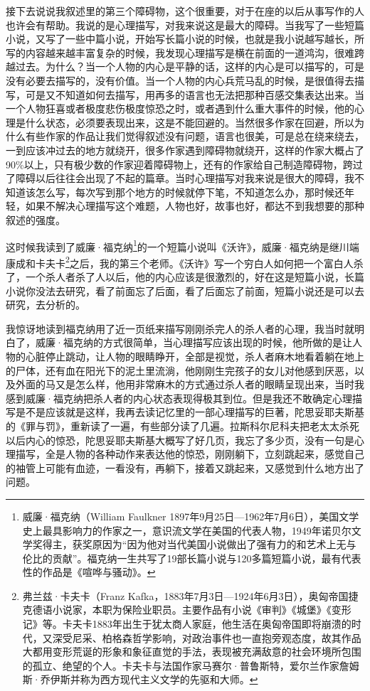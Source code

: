 \documentclass[fontset=fandol,12pt,a5paper]{ctexbook}
\begin{document}
接下去说说我叙述里的第三个障碍物，这个很重要，对于在座的以后从事写作的人也许会有帮助。我说的是心理描写，对我来说这是最大的障碍。当我写了一些短篇小说，又写了一些中篇小说，开始写长篇小说的时候，也就是我小说越写越长，所写的内容越来越丰富复杂的时候，我发现心理描写是横在前面的一道鸿沟，很难跨越过去。为什么？当一个人物的内心是平静的话，这样的内心是可以描写的，可是没有必要去描写的，没有价值。当一个人物的内心兵荒马乱的时候，是很值得去描写，可是又不知道如何去描写，用再多的语言也无法把那种百感交集表达出来。当一个人物狂喜或者极度悲伤极度惊恐之时，或者遇到什么重大事件的时候，他的心理是什么状态，必须要表现出来，这是不能回避的。当然很多作家在回避，所以为什么有些作家的作品让我们觉得叙述没有问题，语言也很美，可是总在绕来绕去，一到应该冲过去的地方就绕开，很多作家遇到障碍物就绕开，这样的作家大概占了90\%以上，只有极少数的作家迎着障碍物上，还有的作家给自己制造障碍物，跨过了障碍以后往往会出现了不起的篇章。当时心理描写对我来说是很大的障碍，我不知道该怎么写，每次写到那个地方的时候就停下笔，不知道怎么办，那时候还年轻，如果不解决心理描写这个难题，人物也好，故事也好，都达不到我想要的那种叙述的强度。

这时候我读到了威廉·福克纳\footnote{威廉·福克纳（William Faulkner 1897年9月25日—1962年7月6日），美国文学史上最具影响力的作家之一，意识流文学在美国的代表人物，1949年诺贝尔文学奖得主，获奖原因为“因为他对当代美国小说做出了强有力的和艺术上无与伦比的贡献”。福克纳一生共写了19部长篇小说与120多篇短篇小说，最有代表性的作品是《喧哗与骚动》。}的一个短篇小说叫《沃许》，威廉·福克纳是继川端康成和卡夫卡\footnote{弗兰兹·卡夫卡（Franz Kafka，1883年7月3日—1924年6月3日），奥匈帝国捷克德语小说家，本职为保险业职员。主要作品有小说《审判》《城堡》《变形记》等。卡夫卡1883年出生于犹太商人家庭，他生活在奥匈帝国即将崩溃的时代，又深受尼采、柏格森哲学影响，对政治事件也一直抱旁观态度，故其作品大都用变形荒诞的形象和象征直觉的手法，表现被充满敌意的社会环境所包围的孤立、绝望的个人。卡夫卡与法国作家马赛尔·普鲁斯特，爱尔兰作家詹姆斯·乔伊斯并称为西方现代主义文学的先驱和大师。}之后，我的第三个老师。《沃许》写一个穷白人如何把一个富白人杀了，一个杀人者杀了人以后，他的内心应该是很激烈的，好在这是短篇小说，长篇小说你没法去研究，看了前面忘了后面，看了后面忘了前面，短篇小说还是可以去研究，去分析的。

我惊讶地读到福克纳用了近一页纸来描写刚刚杀完人的杀人者的心理，我当时就明白了，威廉·福克纳的方式很简单，当心理描写应该出现的时候，他所做的是让人物的心脏停止跳动，让人物的眼睛睁开，全部是视觉，杀人者麻木地看着躺在地上的尸体，还有血在阳光下的泥土里流淌，他刚刚生完孩子的女儿对他感到厌恶，以及外面的马又是怎么样，他用非常麻木的方式通过杀人者的眼睛呈现出来，当时我感到威廉·福克纳把杀人者的内心状态表现得极其到位。但是我还不敢确定心理描写是不是应该就是这样，我再去读记忆里的一部心理描写的巨著，陀思妥耶夫斯基的《罪与罚》，重新读了一遍，有些部分读了几遍。拉斯科尔尼科夫把老太太杀死以后内心的惊恐，陀思妥耶夫斯基大概写了好几页，我忘了多少页，没有一句是心理描写，全是人物的各种动作来表达他的惊恐，刚刚躺下，立刻跳起来，感觉自己的袖管上可能有血迹，一看没有，再躺下，接着又跳起来，又感觉到什么地方出了问题。
\end{document}
